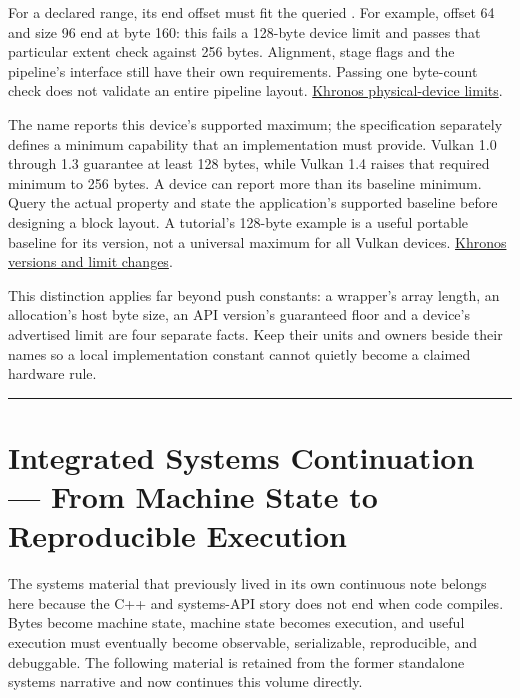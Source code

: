 For a declared range, its end offset must fit the queried . For example, offset 64 and size 96 end at byte 160: this fails a 128-byte device limit and passes that particular extent check against 256 bytes. Alignment, stage flags and the pipeline's interface still have their own requirements. Passing one byte-count check does not validate an entire pipeline layout. \href{https://docs.vulkan.org/spec/latest/chapters/limits.html}{Khronos physical-device limits}.

The name  reports this device's supported maximum; the specification separately defines a minimum capability that an implementation must provide. Vulkan 1.0 through 1.3 guarantee at least 128 bytes, while Vulkan 1.4 raises that required minimum to 256 bytes. A device can report more than its baseline minimum. Query the actual property and state the application's supported baseline before designing a block layout. A tutorial's 128-byte example is a useful portable baseline for its version, not a universal maximum for all Vulkan devices. \href{https://docs.vulkan.org/guide/latest/versions.html}{Khronos versions and limit changes}.

This distinction applies far beyond push constants: a wrapper's array length, an allocation's host byte size, an API version's guaranteed floor and a device's advertised limit are four separate facts. Keep their units and owners beside their names so a local implementation constant cannot quietly become a claimed hardware rule.

\begin{center}\rule{0.5\linewidth}{0.5pt}\end{center}

\section{Integrated Systems Continuation --- From Machine State to Reproducible Execution}\label{01-foundations-i-ch016-integrated-systems-continuation-from-machine-state-to-reproducible-execution}

\hypertarget{01-foundations-i-ch016-integrated-systems-continuation-from-machine-state-to-reproducible-execution}{}

The systems material that previously lived in its own continuous note belongs here because the C++ and systems-API story does not end when code compiles. Bytes become machine state, machine state becomes execution, and useful execution must eventually become observable, serializable, reproducible, and debuggable. The following material is retained from the former standalone systems narrative and now continues this volume directly.

